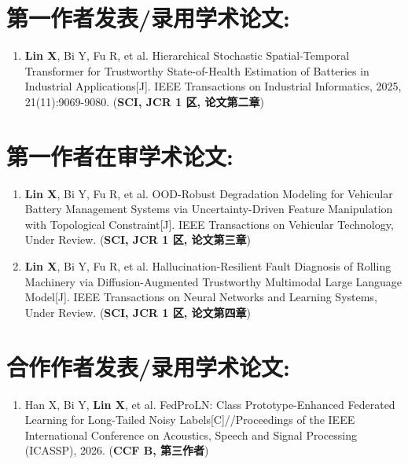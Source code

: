 {    %
    
    \section*{第一作者发表/录用学术论文:}
    \begin{enumerate}[leftmargin=*]
        \item \textbf{Lin X}, Bi Y, Fu R, et al. Hierarchical Stochastic Spatial-Temporal Transformer for Trustworthy State-of-Health Estimation of Batteries in Industrial Applications[J]. IEEE Transactions on Industrial Informatics, 2025, 21(11):9069-9080. (\textbf{SCI, JCR 1 区, 论文第二章})
    \end{enumerate}
    \section*{第一作者在审学术论文:}
    \begin{enumerate}[leftmargin=*]
        \item \textbf{Lin X}, Bi Y, Fu R, et al. OOD-Robust Degradation Modeling for Vehicular Battery Management Systems via Uncertainty-Driven Feature Manipulation with Topological Constraint[J]. IEEE Transactions on Vehicular Technology, Under Review. (\textbf{SCI, JCR 1 区, 论文第三章})
        \item \textbf{Lin X}, Bi Y, Fu R, et al. Hallucination-Resilient Fault Diagnosis of Rolling Machinery via Diffusion-Augmented Trustworthy Multimodal Large Language Model[J]. IEEE Transactions on Neural Networks and Learning Systems, Under Review. (\textbf{SCI, JCR 1 区, 论文第四章})
    \end{enumerate}
    \section*{合作作者发表/录用学术论文:}
    \begin{enumerate}[leftmargin=*]
        \item Han X, Bi Y, \textbf{Lin X}, et al. FedProLN: Class Prototype-Enhanced Federated Learning for Long-Tailed Noisy Labels[C]//Proceedings of the IEEE International Conference on Acoustics, Speech and Signal Processing (ICASSP), 2026. (\textbf{CCF B, 第三作者})
    \end{enumerate}
}
